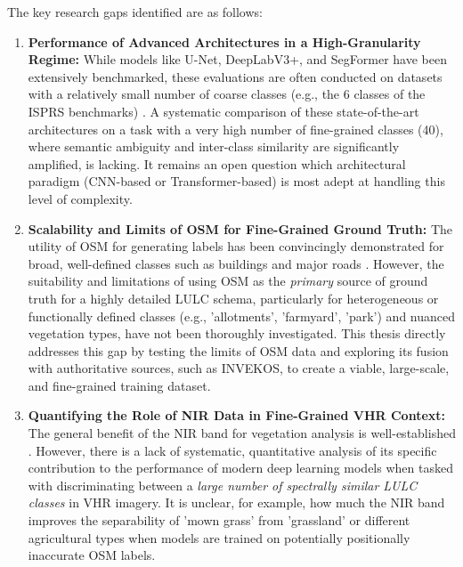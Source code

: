 \documentclass{report}
\begin{document}
The key research gaps identified are as follows:
\begin{enumerate}
\item \textbf{Performance of Advanced Architectures in a High-Granularity Regime:} While models like U-Net, DeepLabV3+, and SegFormer have been extensively benchmarked, these evaluations are often conducted on datasets with a relatively small number of coarse classes (e.g., the 6 classes of the ISPRS benchmarks) \parencite[p.~2, 8]{SertelEtAlLandUseLandCoverMappingUsingDeepLearningBasedSegmentationApproachesVHRWorldview3Images2022}. A systematic comparison of these state-of-the-art architectures on a task with a very high number of fine-grained classes (40), where semantic ambiguity and inter-class similarity are significantly amplified, is lacking. It remains an open question which architectural paradigm (CNN-based or Transformer-based) is most adept at handling this level of complexity.

\item \textbf{Scalability and Limits of OSM for Fine-Grained Ground Truth:} The utility of OSM for generating labels has been convincingly demonstrated for broad, well-defined classes such as buildings and major roads \parencite[p.~1, 13]{KaiserEtAlLearningAerialImageSegmentationOnlineMaps2017}. However, the suitability and limitations of using OSM as the \textit{primary} source of ground truth for a highly detailed LULC schema, particularly for heterogeneous or functionally defined classes (e.g., 'allotments', 'farmyard', 'park') and nuanced vegetation types, have not been thoroughly investigated. This thesis directly addresses this gap by testing the limits of OSM data and exploring its fusion with authoritative sources, such as INVEKOS, to create a viable, large-scale, and fine-grained training dataset.

    \item \textbf{Quantifying the Role of NIR Data in Fine-Grained VHR Context:} The general benefit of the NIR band for vegetation analysis is well-established \parencite[p.~180]{LuoEtAlSemanticsegmentationagriculturalimagessurvey2024}. However, there is a lack of systematic, quantitative analysis of its specific contribution to the performance of modern deep learning models when tasked with discriminating between a \textit{large number of spectrally similar LULC classes} in VHR imagery. It is unclear, for example, how much the NIR band improves the separability of 'mown grass' from 'grassland' or different agricultural types when models are trained on potentially positionally inaccurate OSM labels.


\end{enumerate}
\end{document}
